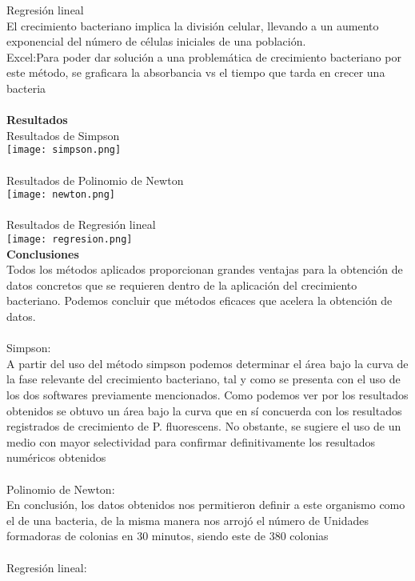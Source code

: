 \documentclass[12pt,a4paper]{article}
\begin{document}
    Regresión lineal\\El crecimiento bacteriano implica la división celular, llevando a un aumento exponencial del número de células iniciales de una población.\\
    Excel:Para poder dar solución a una problemática de crecimiento bacteriano por este método, se graficara la absorbancia vs el tiempo que tarda en crecer una bacteria\\\\
     \textbf{Resultados}\\
     Resultados de Simpson\\
     \texttt{[image: simpson.png]}\\\\
    Resultados de Polinomio de Newton\\
    \texttt{[image: newton.png]}\\\\
    Resultados de Regresión lineal\\
    \texttt{[image: regresion.png]}\\
    \textbf{Conclusiones}\\
    Todos los métodos aplicados proporcionan grandes ventajas para la obtención de datos concretos que se requieren dentro de la aplicación del crecimiento bacteriano. Podemos concluir que métodos eficaces que acelera la obtención de datos. \\\\
    Simpson:\\
    A partir del uso del método simpson podemos determinar el área bajo la curva de  la fase relevante del crecimiento bacteriano, tal y como se presenta con el uso de los dos softwares previamente mencionados. Como podemos ver por los resultados obtenidos se obtuvo un área bajo la curva que en sí concuerda con los resultados registrados de crecimiento de  P. fluorescens. No obstante, se sugiere el uso de un medio con mayor selectividad para confirmar definitivamente los resultados numéricos obtenidos \\\\
    Polinomio de Newton:\\
    En conclusión, los datos obtenidos nos permitieron definir a este organismo como el de una bacteria, de la misma manera nos arrojó el número de Unidades formadoras de colonias en 30 minutos, siendo este de 380 colonias\\\\
    Regresión lineal:\\
\end{document}
